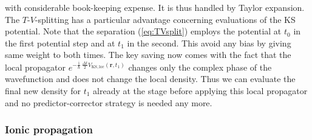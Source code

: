 \documentclass[final,1p]{elsarticle}
\newcommand{\I}{\mathrm{i}}
\begin{document}
with considerable book-keeping expense. It is thus handled by Taylor
expansion. The $T$-$V$-splitting has a particular advantage concerning
evaluations of the KS potential. Note that the separation
(\ref{eq:TVsplit}) employs the potential at $t_0$ in the first
potential step and at $t_1$ in the second. This avoid any bias by
giving same weight to both times. The key saving now comes with the
fact that the local propagator
$e^{-\frac{\I}{\hbar}\,\frac{\Delta{t}}{2}{V}_\mathrm{KS,loc}(\mathbf{r},t_1)}$
changes only the complex phase of the wavefunction and does not change
the local density. Thus we can evaluate the final new density for $t_1$
already at the stage before applying this local propagator
and no predictor-corrector strategy is needed any more.


\subsubsection{Ionic propagation}
\label{sec:numdynion}
\end{document}
